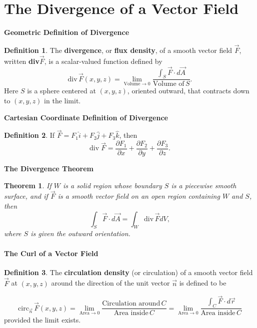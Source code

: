 \documentclass[12pt, a4paper]{article}
\theoremstyle{plain}
\newtheorem{theorem}{Theorem}[section]
\theoremstyle{definition}
\newtheorem{definition}{Definition}[section]
\theoremstyle{remark}
\begin{document}
\newpage

\part{The Divergence of a Vector Field}

\textbf{Geometric Definition of Divergence}

\begin{definition}
The \textbf{divergence}, or \textbf{flux density}, of a smooth vector field $\vec{F}$, written \textbf{div}$\vec{F}$, is a scalar-valued function defined by 
$$ \text{div} \, \vec{F}(x, y, z) = \lim_{\text{Volume} \to 0} \frac{\int_S \vec{F} \cdot d \vec{A}}{\text{Volume of} \, S}.$$
Here $S$ is a sphere centered at $(x, y, z)$, oriented outward, that contracts down to $(x, y, z)$ in the limit.
\end{definition}



\textbf{Cartesian Coordinate Definition of Divergence}

\begin{definition}
If $\vec{F} = F_1 \hat{i} + F_2 \hat{j} + F_3 \hat{k}$, then 
$$ \text{div} \; \vec{F} = \frac{\partial F_1}{\partial x}+ \frac{\partial F_2}{\partial y}+ \frac{\partial F_3}{\partial z}.$$
\end{definition}




\textbf{The Divergence Theorem}

\begin{theorem}
If $W$ is a solid region whose boundary $S$ is a piecewise smooth surface, and if $\vec{F}$ is a smooth vector field on an open region containing $W$ and $S$, then 
$$ \int_S \vec{F} \cdot d \vec{A} = \int_W \text{div} \, \vec{F} dV,$$
where $S$ is given the outward orientation.
\end{theorem}















\subsection{The Curl of a Vector Field}

\begin{definition}
The \textbf{circulation density} (or circulation) of a smooth vector field $\vec{F}$ at $(x, y, z)$ around the direction of the unit vector $\vec{n}$ is defined to be

$$ \text{circ}_{\vec{n}} \, \vec{F}(x, y, z) = \lim_{\text{Area} \to 0} \frac{\text{Circulation around} \, C}{\text{Area inside} \, C} =   \lim_{\text{Area} \to 0} \frac{\int_C \vec{F} \cdot d\vec{r}}{\text{Area inside} \, C} $$
provided the limit exists.
\end{definition}
\end{document}
